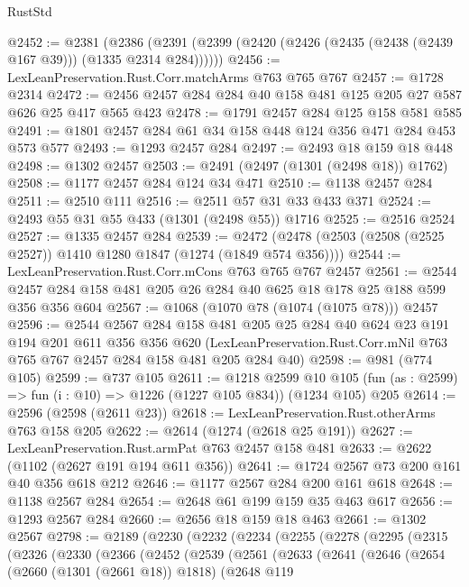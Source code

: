 \begin{lexlean}{RustStd}
\begin{coremodule}
@2452 := @2381
    (@2386 (@2391 (@2399 (@2420 (@2426 (@2435 (@2438 (@2439 @167 @39))) (@1335 @2314 @284))))))
@2456 := LexLeanPreservation.Rust.Corr.matchArms @763 @765 @767
@2457 := @1728 @2314
@2472 := @2456 @2457 @284 @284 @40 @158 @481 @125 @205 @27 @587 @626 @25 @417 @565 @423
@2478 := @1791 @2457 @284 @125 @158 @581 @585
@2491 := @1801 @2457 @284 @61 @34 @158 @448 @124 @356 @471 @284 @453 @573 @577
@2493 := @1293 @2457 @284
@2497 := @2493 @18 @159 @18 @448
@2498 := @1302 @2457
@2503 := @2491 (@2497 (@1301 (@2498 @18)) @1762)
@2508 := @1177 @2457 @284 @124 @34 @471
@2510 := @1138 @2457 @284
@2511 := @2510 @111
@2516 := @2511 @57 @31 @33 @433 @371
@2524 := @2493 @55 @31 @55 @433 (@1301 (@2498 @55)) @1716
@2525 := @2516 @2524
@2527 := @1335 @2457 @284
@2539 := @2472 (@2478 (@2503 (@2508 (@2525 @2527)) @1410 @1280 @1847 (@1274 (@1849 @574 @356))))
@2544 := LexLeanPreservation.Rust.Corr.mCons @763 @765 @767 @2457
@2561 := @2544 @2457 @284 @158 @481 @205 @26 @284 @40 @625 @18 @178 @25 @188 @599 @356 @356 @604
@2567 := @1068 (@1070 @78 (@1074 (@1075 @78))) @2457
@2596 := @2544
    @2567
    @284
    @158
    @481
    @205
    @25
    @284
    @40
    @624
    @23
    @191
    @194
    @201
    @611
    @356
    @356
    @620
    (LexLeanPreservation.Rust.Corr.mNil @763 @765 @767 @2457 @284 @158 @481 @205 @284 @40)
@2598 := @981 (@774 @105)
@2599 := @737 @105
@2611 := @1218
    @2599
    @10
    @105
    (fun (as : @2599) => fun (i : @10) => @1226 (@1227 @105 @834))
    (@1234 @105)
    @205
@2614 := @2596 (@2598 (@2611 @23))
@2618 := LexLeanPreservation.Rust.otherArms @763 @158 @205
@2622 := @2614 (@1274 (@2618 @25 @191))
@2627 := LexLeanPreservation.Rust.armPat @763 @2457 @158 @481
@2633 := @2622 (@1102 (@2627 @191 @194 @611 @356))
@2641 := @1724 @2567 @73 @200 @161 @40 @356 @618 @212
@2646 := @1177 @2567 @284 @200 @161 @618
@2648 := @1138 @2567 @284
@2654 := @2648 @61 @199 @159 @35 @463 @617
@2656 := @1293 @2567 @284
@2660 := @2656 @18 @159 @18 @463
@2661 := @1302 @2567
@2798 := @2189
    (@2230
      (@2232
        (@2234
          (@2255
            (@2278
              (@2295
                (@2315
                  (@2326
                    (@2330
                      (@2366
                        (@2452
                          (@2539
                            (@2561
                              (@2633
                                (@2641
                                  (@2646
                                    (@2654
                                      (@2660 (@1301 (@2661 @18)) @1818)
                                      (@2648
                                        @119

\end{coremodule}
\end{lexlean}
